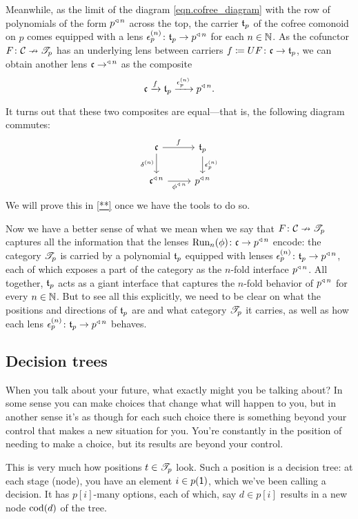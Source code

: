 \documentclass[Book-Poly]{subfiles}
\begin{document}
Meanwhile, as the limit of the diagram \eqref{eqn.cofree_diagram} with the row of polynomials of the form $p^{\mathbin{\triangleleft}\,n}$ across the top, the carrier $\mathfrak{t}_p$ of the cofree comonoid on $p$ comes equipped with a lens $\epsilon^{(n)}_p\colon\mathfrak{t}_p\to p^{\mathbin{\triangleleft}\,n}$ for each $n\in\mathbb{N}$.
As the cofunctor $F\colon\mathcal{C}\nrightarrow\mathscr{T}_{p}$ has an underlying lens between carriers $f\coloneqq UF\colon\mathfrak{c}\to\mathfrak{t}_p$, we can obtain another lens $\mathfrak{c}\to^{\mathbin{\triangleleft}\,n}$ as the composite
\[
    \mathfrak{c}\xrightarrow{f}\mathfrak{t}_p\xrightarrow{\epsilon^{(n)}_p}p^{\mathbin{\triangleleft}\,n}.
\]

It turns out that these two composites are equal---that is, the following diagram commutes:
\[
\begin{tikzcd}
    \ema{c} \ar[r,"f"] \ar[d, "\delta^{(n)}"'] & \ema{t}_p \ar[d, "\epsilon^{(n)}_p"] \\
    \ema{c}\tripow{n} \ar[r, "\phi\tripow{n}"'] & p\tripow{n}
\end{tikzcd}
\]
We will prove this in \cref{**} once we have the tools to do so.

Now we have a better sense of what we mean when we say that $F\colon\mathcal{C}\nrightarrow\mathscr{T}_{p}$ captures all the information that the lenses $\text{Run}_n(\phi)\colon\mathfrak{c}\to p^{\mathbin{\triangleleft}\,n}$ encode: the category $\mathscr{T}_{p}$ is carried by a polynomial $\mathfrak{t}_p$ equipped with lenses $\epsilon^{(n)}_p\colon\mathfrak{t}_p\to p^{\mathbin{\triangleleft}\,n}$, each of which exposes a part of the category as the $n$-fold interface $p^{\mathbin{\triangleleft}\,n}$.
All together, $\mathfrak{t}_p$ acts as a giant interface that captures the $n$-fold behavior of $p^{\mathbin{\triangleleft}\,n}$ for every $n\in\mathbb{N}$.
But to see all this explicitly, we need to be clear on what the positions and directions of $\mathfrak{t}_p$ are and what category $\mathscr{T}_{p}$ it carries, as well as how each lens $\epsilon^{(n)}_p\colon\mathfrak{t}_p\to p^{\mathbin{\triangleleft}\,n}$ behaves.


\subsection{Decision trees}

When you talk about your future, what exactly might you be talking about? In some sense you can make choices that change what will happen to you, but in another sense it's as though for each such choice there is something beyond your control that makes a new situation for you. You're constantly in the position of needing to make a choice, but its results are beyond your control.

This is very much how positions $t\in\mathscr{T}_{p}$ look. Such a position is a decision tree: at each stage (node), you have an element $i\in p(\textsf{1})$, which we've been calling a decision. It has $p[i]$-many options, each of which, say $d\in p[i]$ results in a new node $\operatorname{cod}(d)$ of the tree.
\end{document}
